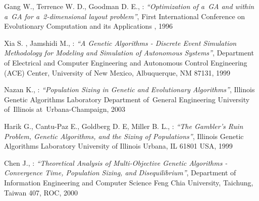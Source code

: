 

\begin{thebibliography}{99}

Gang W., Terrence W. D., Goodman D. E., : \textit{``Optimization of a~GA and
within a~GA for a~2-dimensional layout problem''}, First International Conference on
Evolutionary Computation and its Applications , 1996

	Xia S. , Jamshidi M., : \textit{``A Genetic Algorithms - Discrete Event Simulation
  Methodology for Modeling and Simulation of Autonomous Systems''},
 Department of Electrical and Computer Engineering and Autonomous Control Engineering
 (ACE) Center, University of New Mexico, Albuquerque, NM 87131, 1999

	Nazan K., : \textit{``Population Sizing in Genetic and Evolutionary Algorithms''},
	 Illinois Genetic Algorithms Laboratory Department of~General Engineering University 
	 of~Illinois at~Urbana-Champaign, 2003

	Harik G., Cantu-Paz E., Goldberg D. E, Miller B. L., : \textit{``The Gambler’s Ruin Problem, Genetic Algorithms, and the Sizing of Populations''}, 
	Illinois Genetic Algorithms Laboratory University of Illinois Urbana, IL
	61801 USA, 1999

	Chen J., : \textit{``Theoretical Analysis of Multi-Objective Genetic
Algorithms - Convergence Time, Population Sizing, and Disequilibrium''}, 
Department of Information Engineering and Computer Science Feng Chia University,
Taichung, Taiwan 407, ROC, 2000

\end{thebibliography}
\newpage
\listoffigures
\listoftables

